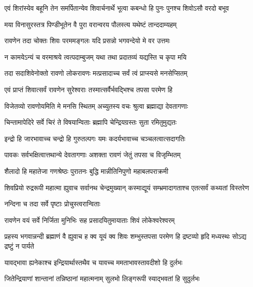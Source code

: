 \twolineshloka
{एवं शिरांस्येव बहूनि तेन समर्पितान्येव शिवार्चनार्थे}
{भूत्वा कबन्धो हि पुनः पुनश्च शिवोऽसौ वरदो बभूव}%

\twolineshloka
{मया विनासुरस्तत्र पिण्डीभूतेन वै पुरा}
{वरान्वरय पौलस्त्य यथेष्टं तान्ददाम्यहम्}%

\twolineshloka
{रावणेन तदा चोक्तः शिवः परममङ्गलः}
{यदि प्रसन्नो भगवन्देयो मे वर उत्तमः}%

\twolineshloka
{न कामयेऽन्यं च वरमाश्रये त्वत्पदाम्बुजम्}
{यथा तथा प्रदातव्यं यद्यस्ति च कृपा मयि}%

\twolineshloka
{तदा सदाशिवेनोक्तो रावणो लोकरावणः}
{मत्प्रसादाच्च सर्वं त्वं प्राप्स्यसे मनसेप्सितम्}%

\twolineshloka
{एवं प्राप्तं शिवात्सर्वं रावणेन सुरेश्वराः}
{तस्मात्सर्वैर्भवद्भिश्च तपसा परमेण हि}%

\twolineshloka
{विजेतव्यो रावणोयमिति मे मनसि स्थितम्}
{अच्युतस्य वचः श्रुत्वा ब्रह्माद्या देवतागणाः}%

\twolineshloka
{चिन्तामापेदिरे सर्वे चिरं ते विषयान्विताः}
{ब्रह्मापि चेन्द्रियग्रस्तः सुता रमितुमुद्यतः}%

\twolineshloka
{इन्द्रो हि जारभावाच्च चन्द्रो हि गुरुतल्पगः}
{यमः कदर्यभावाच्च चञ्चलत्वात्सदागतिः}%

\twolineshloka
{पावकः सर्वभक्षित्वात्तथान्ये देवतागणाः}
{अशक्ता रावणं जेतुं तपसा च विजृम्भितम्}%

\twolineshloka
{शैलादो हि महातेजा गणश्रेष्ठः पुरातनः}
{बुद्धि मान्नीतिनिपुणो महाबलपराक्रमी}%

\twolineshloka
{शिवप्रियो रुद्ररूपी महात्मा ह्युवाच सर्वानथ चेन्द्रमुख्यान्}
{कस्माद्यूयं सम्भ्रमादागताश्च एतत्सर्वं कथ्यतां विस्तरेण}%

\onelineshloka
{नन्दिना च तदा सर्वे पृष्टाः प्रोचुस्त्वरान्विताः}%


\twolineshloka
{रावणेन वयं सर्वे निर्जिता मुनिभिः सह}
{प्रसादयितुमायाताः शिवं लोकेश्वरेश्वरम्}%

\threelineshloka
{प्रहस्य भगवान्नन्दी ब्रह्माणं वै ह्युवाच ह}
{क्व यूयं क्व शिवः शम्भुस्तपसा परमेण हि}
{द्रष्टव्यो हृदि मध्यस्थः सोऽद्य द्रष्टुं न पार्यते}%

\twolineshloka
{यावद्भावा ह्यनेकाश्च इन्द्रियार्थास्तथैव च}
{यावच्च ममताभावस्तावदीशो हि दुर्लभः}%

\twolineshloka
{जितेन्द्रियाणां शान्तानां तन्निष्ठानां महात्मनाम्}
{सुलभो लिङ्गरूपी स्याद्भवतां हि सुदुर्लभः}%

